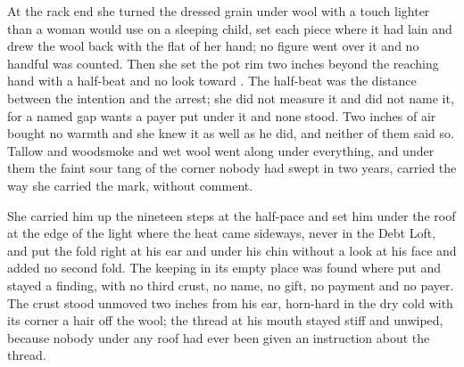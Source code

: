At the rack end she turned the dressed grain under wool with a touch lighter than a woman would use on a sleeping child, set each piece where it had lain and drew the wool back with the flat of her hand; no figure went over it and no handful was counted. Then she set the pot rim two inches beyond the reaching hand with a half-beat and no look toward . The half-beat was the distance between the intention and the arrest; she did not measure it and did not name it, for a named gap wants a payer put under it and none stood. Two inches of air bought no warmth and she knew it as well as he did, and neither of them said so. Tallow and woodsmoke and wet wool went along under everything, and under them the faint sour tang of the corner nobody had swept in two years, carried the way she carried the mark, without comment.

She carried him up the nineteen steps at the half-pace and set him under the roof at the edge of the light where the heat came sideways, never in the Debt Loft, and put the fold right at his ear and under his chin without a look at his face and added no second fold. The keeping in its empty place was found where put and stayed a finding, with no third crust, no name, no gift, no payment and no payer. The crust stood unmoved two inches from his ear, horn-hard in the dry cold with its corner a hair off the wool; the thread at his mouth stayed stiff and unwiped, because nobody under any roof had ever been given an instruction about the thread.

\scenebreak

